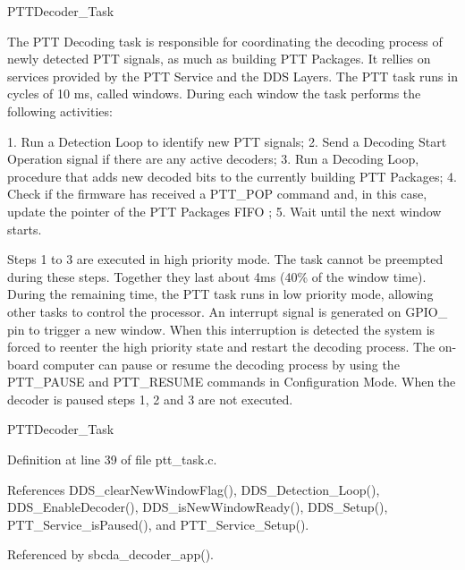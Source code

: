 P\+T\+T\+Decoder\+\_\+\+Task

The P\+TT Decoding task is responsible for coordinating the decoding process of newly detected P\+TT signals, as much as building P\+TT Packages. It rellies on services provided by the P\+TT Service and the D\+DS Layers. The P\+TT task runs in cycles of 10 ms, called windows. During each window the task performs the following activities\+: 
\begin{DoxyPre}
  1.    Run a Detection Loop to identify new PTT signals;
  2.    Send a Decoding Start Operation signal if there are any active decoders;
  3.    Run a Decoding Loop, procedure that adds new decoded bits to the currently building PTT Packages;
  4.    Check if the firmware has received a PTT\_POP command and, in this case, update the pointer of the PTT Packages FIFO  ;
  5.    Wait until the next window starts.
\end{DoxyPre}
 Steps 1 to 3 are executed in high priority mode. The task cannot be preempted during these steps. Together they last about 4ms (40\% of the window time). During the remaining time, the P\+TT task runs in low priority mode, allowing other tasks to control the processor. An interrupt signal is generated on G\+P\+I\+O\+\_ pin to trigger a new window. When this interruption is detected the system is forced to reenter the high priority state and restart the decoding process. The on-\/board computer can pause or resume the decoding process by using the P\+T\+T\+\_\+\+P\+A\+U\+SE and P\+T\+T\+\_\+\+R\+E\+S\+U\+ME commands in Configuration Mode. When the decoder is paused steps 1, 2 and 3 are not executed.

P\+T\+T\+Decoder\+\_\+\+Task 

Definition at line 39 of file ptt\+\_\+task.\+c.



References D\+D\+S\+\_\+clear\+New\+Window\+Flag(), D\+D\+S\+\_\+\+Detection\+\_\+\+Loop(), D\+D\+S\+\_\+\+Enable\+Decoder(), D\+D\+S\+\_\+is\+New\+Window\+Ready(), D\+D\+S\+\_\+\+Setup(), P\+T\+T\+\_\+\+Service\+\_\+is\+Paused(), and P\+T\+T\+\_\+\+Service\+\_\+\+Setup().



Referenced by sbcda\+\_\+decoder\+\_\+app().

